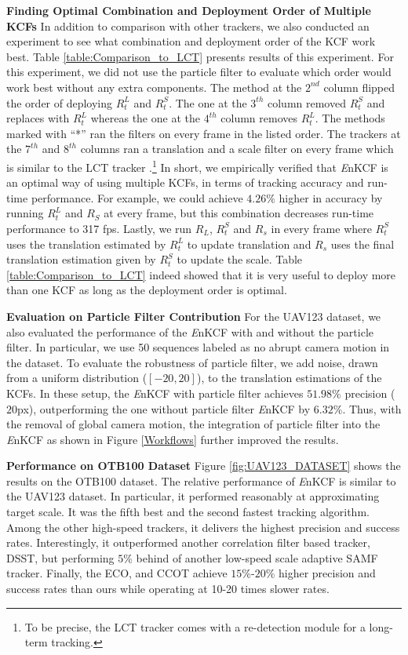 \documentclass[10pt,twocolumn,letterpaper]{article}
\begin{document}
\textbf{Finding Optimal Combination and Deployment Order of Multiple
  KCFs} In addition to comparison with other trackers, we
also conducted an experiment to see what combination and deployment
order of the KCF work best. Table \ref{table:Comparison_to_LCT}
presents results of this experiment. For this experiment, we did not
use the particle filter to evaluate which order would work best
without any extra components. The method at the $2^{nd}$ column
flipped the order of deploying $R_{t}^{L}$ and $R_{t}^{S}$. The one at
the $3^{th}$ column removed $R_{t}^{S}$ and replaces with $R_{t}^{L}$
whereas the one at the $4^{th}$ column removes $R_{t}^{L}$. The
methods marked with ``*'' ran the filters on every frame in the listed
order. The trackers at the $7^{th}$ and $8^{th}$ columns ran a
translation and a scale filter on every frame which is similar to
the LCT tracker \cite{ma2015long}.\footnote{To be
  precise, the LCT tracker comes with a re-detection module for a
  long-term tracking.} In short, we empirically verified that
\textit{E}nKCF is an optimal way of using multiple KCFs, in terms of
tracking accuracy and run-time performance. For example, we could
achieve $4.26\%$ higher in accuracy by running $R_{t}^{L}$ and $R_{S}$
at every frame, but this combination decreases run-time performance to
317 fps. Lastly, we run $R_{L}$, $R_{t}^{S}$ and $R_{s}$ in every
frame where $R_{t}^{S}$ uses the translation estimated by $R_{t}^{L}$
to update translation and $R_{s}$ uses the final translation
estimation given by $R_{t}^{S}$ to update the scale. Table
\ref{table:Comparison_to_LCT} indeed showed that it is very useful to
deploy more than one KCF as long as the deployment order is optimal.

\textbf{Evaluation on Particle Filter Contribution} For the UAV123
dataset, we also evaluated the performance of the {\it E}nKCF with and
without the particle filter. In particular, we use 50 sequences
labeled as no abrupt camera motion in the dataset. To evaluate the
robustness of particle filter, we add noise, drawn from a uniform
distribution ($[-20,20]$), to the translation estimations of the
KCFs. In these setup, the {\it E}nKCF with particle filter achieves
$51.98\%$ precision ($20$px), outperforming the one without particle
filter {\it E}nKCF by $6.32\%$. Thus, with the removal of global
camera motion, the integration of particle filter into the {\it E}nKCF
as shown in Figure \ref{Workflows} further improved the results.

\textbf{Performance on OTB100 Dataset} Figure \ref{fig:UAV123_DATASET}
shows the results on the OTB100 dataset. The relative performance of {\it E}nKCF 
is similar to the UAV123 dataset. In particular, it performed reasonably at approximating target scale. 
It was the fifth best and the second fastest tracking algorithm. Among the other high-speed trackers,
it delivers the highest precision and success rates. Interestingly, it outperformed another
correlation filter based tracker, DSST, but performing $5\%$ behind of
another low-speed scale adaptive SAMF tracker. Finally, the ECO, and CCOT achieve $15\%$-$20\%$ higher
precision and success rates than ours while operating at 10-20 times slower rates.
\end{document}
